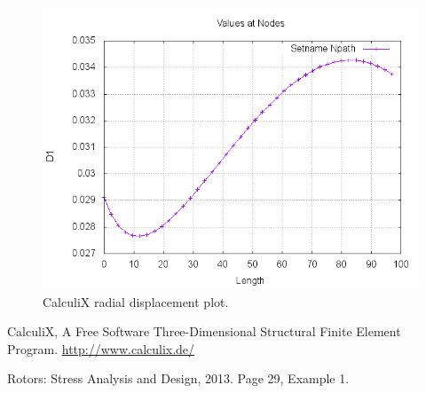\documentclass[12pt, a4paper, twoside]{article}
\begin{document}
\begin{figure}[h]
	\centering
	\includegraphics[scale=0.5]{graph_2}
	\caption{CalculiX radial displacement plot.}
	\label{fig:graph_2}
\end{figure}

\clearpage
\begin{thebibliography}{9}
	
CalculiX, A Free Software Three-Dimensional Structural Finite Element Program. \url{http://www.calculix.de/}

Rotors: Stress Analysis and Design, 2013. Page 29, Example 1. 

\end{thebibliography}
\end{document}
